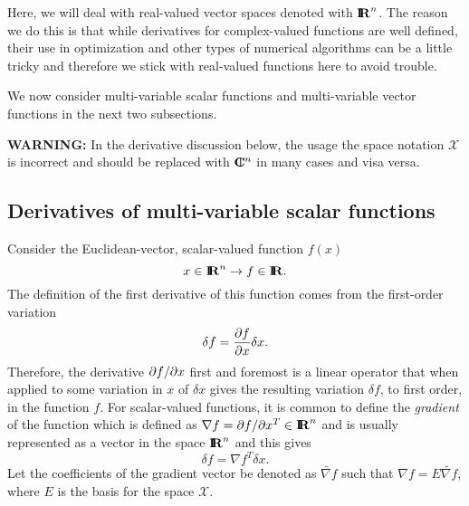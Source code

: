 \documentclass[pdf,ps2pdf,11pt]{SANDreport}
\begin{document}
Here, we will deal with real-valued vector spaces denoted with $\mbox{\textbf{I}}\hspace{-0.6ex}\mbox{\textbf{R}}^n$.  The
reason we do this is that while derivatives for complex-valued functions are
well defined, their use in optimization and other types of numerical
algorithms can be a little tricky and therefore we stick with real-valued
functions here to avoid trouble.

We now consider multi-variable scalar functions and multi-variable vector
functions in the next two subsections.

{}\textbf{WARNING:} In the derivative discussion below, the usage the space
notation $\mathcal{X}$ is incorrect and should be replaced with $\mbox{\textbf{C}}\hspace{-1.1ex}\mbox{l}\hspace{0.4ex}^n$ in
many cases and visa versa.

\subsection{Derivatives of multi-variable scalar functions}
\label{sec:scalar_function_derivatives}
 
Consider the Euclidean-vector, scalar-valued function $f(x)$
\[
x\in\mbox{\textbf{I}}\hspace{-0.6ex}\mbox{\textbf{R}}^n \rightarrow f\in\mbox{\textbf{I}}\hspace{-0.6ex}\mbox{\textbf{R}}.
\]
The definition of the first derivative of this function comes from the
first-order variation
\[
\delta f = \displaystyle{\frac{\partial f}{\partial x}} \delta x.
\]
Therefore, the derivative $\partial f / \partial x$ first and foremost is a linear operator
that when applied to some variation in $x$ of $\delta x$ gives the resulting
variation $\delta f$, to first order, in the function $f$.  For scalar-valued
functions, it is common to define the {}\textit{gradient} of the function
which is defined as $\nabla f = \partial f / \partial x^T {}\in \mbox{\textbf{I}}\hspace{-0.6ex}\mbox{\textbf{R}}^n$ and is usually
represented as a vector in the space $\mbox{\textbf{I}}\hspace{-0.6ex}\mbox{\textbf{R}}^n$ and this gives
\[
\delta f = {\nabla f}^T \delta x.
\]
Let the coefficients of the gradient vector be denoted as $\tilde{\nabla f}$
such that $\nabla f = E {}\tilde{\nabla f}$, where $E$ is the basis for the
space $\mathcal{X}$.
\end{document}

